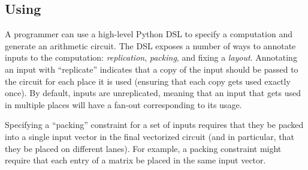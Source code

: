 
\subsection{Using \system}
A programmer can use a high-level Python DSL to specify a computation and generate an arithmetic circuit.
The DSL exposes a number of ways to annotate inputs to the computation: {\em replication}, {\em packing}, and fixing a {\em layout}.
Annotating an input with ``replicate'' indicates that a copy of the input should be passed to the circuit for each place it is used (ensuring that each copy gets used exactly once).
By default, inputs are unreplicated, meaning that an input that gets used in multiple places will have a fan-out corresponding to its usage.

Specifying a ``packing'' constraint for a set of inputs requires that they be packed into a single input vector in the final vectorized circuit (and in particular, that they be placed on different lanes).
For example, a packing constraint might require that each entry of a matrix be placed in the same input vector.

